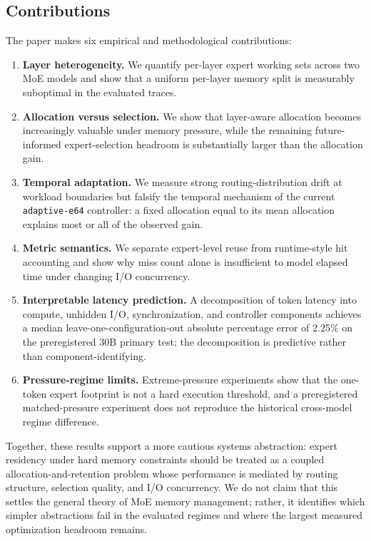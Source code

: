 \subsection{Contributions}

The paper makes six empirical and methodological contributions:
\begin{enumerate}
    \item \textbf{Layer heterogeneity.} We quantify per-layer expert working sets across two MoE models and show that a uniform per-layer memory split is measurably suboptimal in the evaluated traces.
    \item \textbf{Allocation versus selection.} We show that layer-aware allocation becomes increasingly valuable under memory pressure, while the remaining future-informed expert-selection headroom is substantially larger than the allocation gain.
    \item \textbf{Temporal adaptation.} We measure strong routing-distribution drift at workload boundaries but falsify the temporal mechanism of the current \texttt{adaptive-e64} controller: a fixed allocation equal to its mean allocation explains most or all of the observed gain.
    \item \textbf{Metric semantics.} We separate expert-level reuse from runtime-style hit accounting and show why miss count alone is insufficient to model elapsed time under changing I/O concurrency.
    \item \textbf{Interpretable latency prediction.} A decomposition of token latency into compute, unhidden I/O, synchronization, and controller components achieves a median leave-one-configuration-out absolute percentage error of 2.25\% on the preregistered 30B primary test; the decomposition is predictive rather than component-identifying.
    \item \textbf{Pressure-regime limits.} Extreme-pressure experiments show that the one-token expert footprint is not a hard execution threshold, and a preregistered matched-pressure experiment does not reproduce the historical cross-model regime difference.
\end{enumerate}

Together, these results support a more cautious systems abstraction: expert residency under hard memory constraints should be treated as a coupled allocation-and-retention problem whose performance is mediated by routing structure, selection quality, and I/O concurrency. We do not claim that this settles the general theory of MoE memory management; rather, it identifies which simpler abstractions fail in the evaluated regimes and where the largest measured optimization headroom remains.
